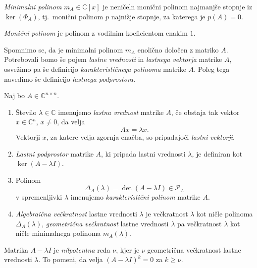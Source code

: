 \documentclass[mat1]{fmfdelo}
\newcommand{\C}{\mathbb C}
\begin{document}
\begin{definicija}
    \emph{Minimalni polinom} $m_A \in \C[x]$ je neničeln monični polinom najmanjše stopnje iz $\ker\left(\Phi_A\right)$, tj.\ monični polinom $p$ najnižje stopnje, za katerega je $p(A) = 0$.
\end{definicija}
\begin{opomba}
    \emph{Monični polinom} je polinom z vodilnim koeficientom enakim $1$.
\end{opomba}
Spomnimo se, da je minimalni polinom $m_A$ enolično določen z matriko $A$. Potrebovali bomo še pojem \emph{lastne vrednosti} in \emph{lastnega vektorja} matrike $A$, osvežimo pa še definicijo \emph{karakterističnega polinoma} matrike $A$. Poleg tega navedimo še definicijo \emph{lastnega podprostora}.
\begin{definicija}
    Naj bo $A \in \C^{n\times n}$.
    \begin{enumerate}
        \item Število $\lambda \in \C$ imenujemo \emph{lastna vrednost} matrike $A$, če obstaja tak vektor $x \in \C^n$, $x \neq 0$, da velja
        \begin{equation*}
            Ax = \lambda x.
        \end{equation*}
        Vektorji $x$, za katere velja zgornja enačba, so pripadajoči \emph{lastni vektorji}.
        \item \emph{Lastni podprostor} matrike $A$, ki pripada lastni vrednosti $\lambda$, je definiran kot $\ker \left(A - \lambda I\right)$.
        \item Polinom
        \begin{equation*}
            \Delta_A(\lambda) = \det \left(A - \lambda I\right) \in \mathcal{P}_A
        \end{equation*}
        v spremenljivki $\lambda$ imenujemo \emph{karakteristični polinom} matrike $A$.
        \item \emph{Algebraična večkratnost} lastne vrednosti $\lambda$ je večkratnost $\lambda$ kot ničle polinoma $\Delta_A\left(\lambda\right)$, \emph{geometrična večkratnost} lastne vrednosti $\lambda$ pa večkratnost $\lambda$ kot ničle minimalnega polinoma $m_A\left(\lambda\right)$.
    \end{enumerate}
\end{definicija}
Matrika $A - \lambda I$ je \emph{nilpotentna} reda $\nu$, kjer je $\nu$ geometrična večkratnost lastne vrednosti $\lambda$. To pomeni, da velja $\left(A - \lambda I\right)^k = 0$ za $k \geq \nu$.
\end{document}
